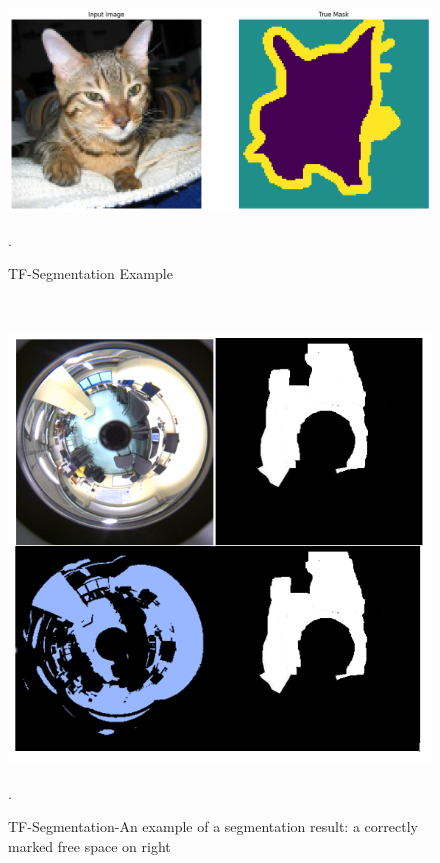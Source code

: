 \documentclass[11pt, a4paper, openany]{book}
\begin{document}
\begin{figure}[H]
    \centering
    \includegraphics[scale=0.4]{Labbot&ele/16.png}
    \caption{TF-Segmentation Example}.
    \label{fig:print} 
\end{figure}\


\begin{figure}[H]
    \centering
    \includegraphics[scale=0.9]{Labbot&ele/tf-segment.png}
    \caption{TF-Segmentation-An example of a segmentation result: a correctly marked free space on right}.
    \label{fig:print} 
\end{figure}
\end{document}
